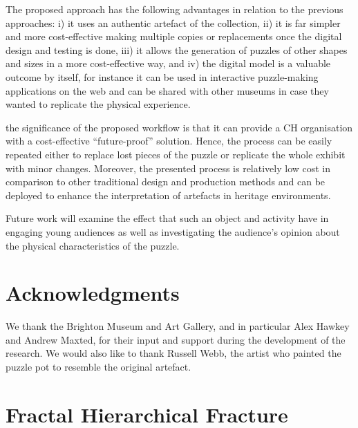 \documentclass[acmlarge,screen,dvipsnames]{acmart}
\begin{document}
The proposed approach has the following advantages in relation to the
previous approaches: i) it uses an authentic artefact of the
collection, ii) it is far simpler and more cost-effective making
multiple copies or replacements once the digital design and testing is
done, iii) it allows the generation of puzzles of other shapes and
sizes in a more cost-effective way, and iv) the digital model is a
valuable outcome by itself, for instance it can be used in interactive
puzzle-making applications on the web and can be shared with other
museums in case they wanted to replicate the physical experience.


 the significance of the proposed workflow is that it can provide a CH organisation with a cost-effective ``future-proof'' solution. Hence,
the process can be easily repeated either to replace lost pieces of
the puzzle or replicate the whole exhibit with minor
changes. Moreover, the presented process is relatively low cost in
comparison to other traditional design and production methods and can
be deployed to enhance the interpretation of artefacts in heritage
environments.

Future work will examine the effect that such an object and activity
have in engaging young audiences as well as investigating the
audience's opinion about the physical characteristics of the puzzle.

\section{Acknowledgments}

We thank the Brighton Museum and Art Gallery, and in particular Alex
Hawkey and Andrew Maxted, for their input and support during the
development of the research. We would also like to thank Russell Webb, the artist who painted the puzzle pot to resemble the original artefact.

\appendix

\newcommand{\IR}{\RR}

\section{Fractal Hierarchical Fracture}
\label{apx:hierarchical-algo}
\end{document}
